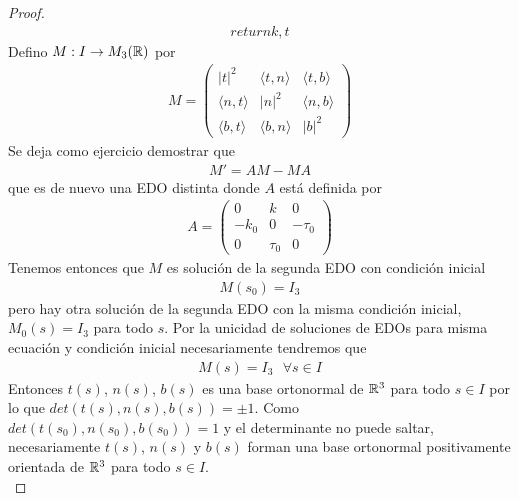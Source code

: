 \begin{teo}
\begin{proof}
\begin{gather*}
  return k, t
        \end{gather*}
        Defino $M:I \to M_3(\mathbb{R})$ por 
        \begin{gather*}
            M = \begin{pmatrix}
                |t|^2 & \langle t,n \rangle & \langle t,b \rangle \\
                \langle n,t \rangle & |n|^2 & \langle n,b \rangle \\
                \langle b,t \rangle & \langle b,n \rangle & |b|^2
            \end{pmatrix}
        \end{gather*}
        Se deja como ejercicio demostrar que 
        \begin{gather*}
            M' = AM - MA
        \end{gather*}
        que es de nuevo una EDO distinta donde $A$ está definida por 
        \begin{gather*}
            A = \begin{pmatrix}
                0 & k & 0\\
                -k_0 & 0 & -\tau_0\\
                0 & \tau_0 & 0
            \end{pmatrix}
        \end{gather*}
        Tenemos entonces que $M$ es solución de la segunda EDO con condición inicial
        \begin{gather*}
            M(s_0) = I_3
        \end{gather*}
        pero hay otra solución de la segunda EDO con la misma condición inicial, $M_0(s) = I_3$ para todo $s$. Por la unicidad de soluciones de EDOs para misma ecuación y condición inicial necesariamente tendremos que 
        \begin{gather*}
            M(s) = I_3 \ \ \ \forall s \in I
        \end{gather*}
        Entonces $t(s)$, $n(s)$, $b(s)$ es una base ortonormal de $\mathbb{R}^3$ para todo $s\in I$ por lo que $det(t(s), n(s), b(s)) = \pm 1$. Como $det(t(s_0), n(s_0), b(s_0)) = 1$ y el determinante no puede saltar, necesariamente $t(s)$, $n(s)$ y $b(s)$ forman una base ortonormal positivamente orientada de $\mathbb{R}^3$ para todo $s\in I$.\\


\end{proof}
\end{teo}
